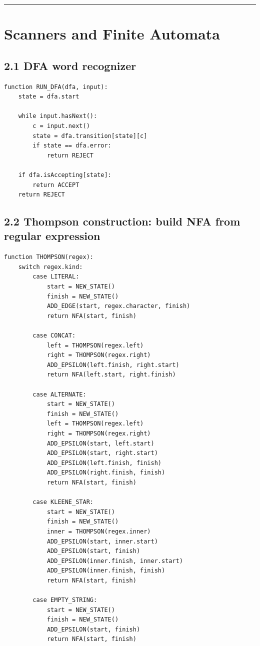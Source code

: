 \documentclass[10pt,letterpaper]{article}
\begin{document}
\medskip\hrule\medskip

\clearpage
\section{Scanners and Finite Automata}

\subsection*{2.1 DFA word recognizer}
{}

\begin{verbatim}
function RUN_DFA(dfa, input):
    state = dfa.start

    while input.hasNext():
        c = input.next()
        state = dfa.transition[state][c]
        if state == dfa.error:
            return REJECT

    if dfa.isAccepting[state]:
        return ACCEPT
    return REJECT
\end{verbatim}

\subsection*{2.2 Thompson construction: build NFA from regular expression}
{}

\begin{verbatim}
function THOMPSON(regex):
    switch regex.kind:
        case LITERAL:
            start = NEW_STATE()
            finish = NEW_STATE()
            ADD_EDGE(start, regex.character, finish)
            return NFA(start, finish)

        case CONCAT:
            left = THOMPSON(regex.left)
            right = THOMPSON(regex.right)
            ADD_EPSILON(left.finish, right.start)
            return NFA(left.start, right.finish)

        case ALTERNATE:
            start = NEW_STATE()
            finish = NEW_STATE()
            left = THOMPSON(regex.left)
            right = THOMPSON(regex.right)
            ADD_EPSILON(start, left.start)
            ADD_EPSILON(start, right.start)
            ADD_EPSILON(left.finish, finish)
            ADD_EPSILON(right.finish, finish)
            return NFA(start, finish)

        case KLEENE_STAR:
            start = NEW_STATE()
            finish = NEW_STATE()
            inner = THOMPSON(regex.inner)
            ADD_EPSILON(start, inner.start)
            ADD_EPSILON(start, finish)
            ADD_EPSILON(inner.finish, inner.start)
            ADD_EPSILON(inner.finish, finish)
            return NFA(start, finish)

        case EMPTY_STRING:
            start = NEW_STATE()
            finish = NEW_STATE()
            ADD_EPSILON(start, finish)
            return NFA(start, finish)
\end{verbatim}
\end{document}
